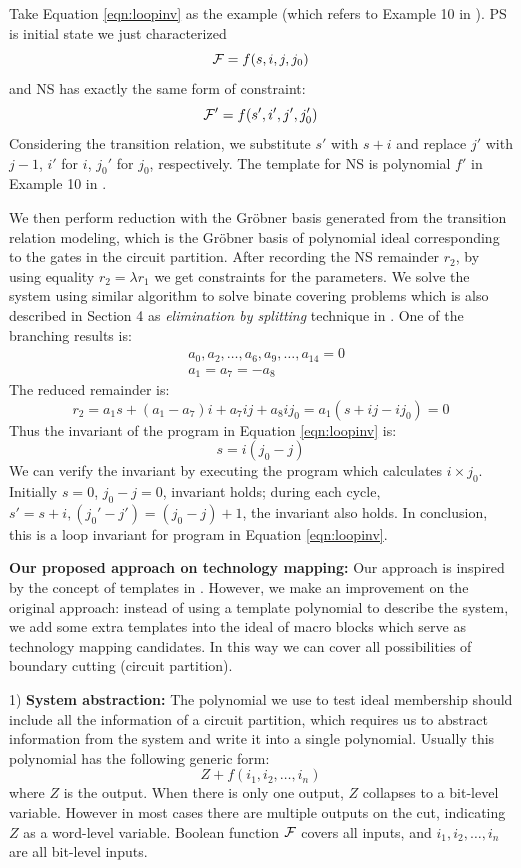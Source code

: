 Take Equation \ref{eqn:loopinv} as the example (which refers to Example 10 in \cite{sankaranarayanan2004non}). 
PS is initial state we just characterized 
$${\mathcal{F}} = f(s,i,j,j_0)$$ 
and NS has exactly the same form of constraint:
$${\mathcal{F}}' = f(s',i',j',j_0')$$
Considering the transition relation, we substitute $s'$ with $s+i$ and replace $j'$
with $j-1$, $i'$ for $i$, $j_0'$ for $j_0$, respectively. 
The template for NS is polynomial $f'$ in Example 10 in \cite{sankaranarayanan2004non}.

We then perform reduction with the Gr\"obner basis generated from the transition relation modeling, 
which is the Gr\"obner basis of polynomial ideal corresponding to the gates in the circuit partition.
After recording the NS remainder $r_2$,
by using equality $r_2 = \lambda r_1$ we get constraints for the parameters. We solve the system using 
similar algorithm to solve binate covering problems
which is also described in Section 4 as \emph{elimination by splitting} technique in \cite{sankaranarayanan2004non}. 
One of the branching results is:
\begin{align*}
&a_0,a_2,\dots, a_6, a_9,\dots,a_{14}=  0\\ 
&a_1=a_7=-a_8
\end{align*}
The reduced remainder is: 
$$r_2 = a_1s +(a_1-a_7)i+a_7ij+a_8ij_0 = a_1(s+ij-ij_0) = 0$$
Thus the invariant of the program in Equation \ref{eqn:loopinv} is:
$$s = i(j_0- j)$$
We can verify the invariant by executing the program which calculates $i\times j_0$. 
Initially $s=0$, $j_0-j=0$, invariant holds;
during each cycle, $s'=s+i, (j_0'-j') = (j_0-j)+1$, the invariant also holds. In conclusion, this is a
loop invariant for program in Equation \ref{eqn:loopinv}.

{\bf Our proposed approach on technology mapping:}
Our approach is inspired by the concept of templates in \cite{sankaranarayanan2004non}. 
However, we make an improvement on the original approach:
instead of using a template polynomial to describe the system, we add some extra templates into the ideal
of macro blocks which serve as technology mapping candidates. In this way we can cover all possibilities
of boundary cutting (circuit partition).

1) {\bf System abstraction:}
The polynomial we use to test ideal membership should include all the information of a circuit partition,
which requires us to abstract information from the system and write it into a single polynomial.
Usually this polynomial has the following generic form:
$$Z + f(i_1,i_2,\dots,i_n)$$
where $Z$ is the output. When there is only one output, $Z$ collapses to a bit-level variable. However in most
cases there are multiple outputs on the cut, indicating $Z$ as a word-level variable. Boolean function ${\mathcal{F}}$ covers
all inputs, and $i_1,i_2,\dots,i_n$ are all bit-level inputs.

